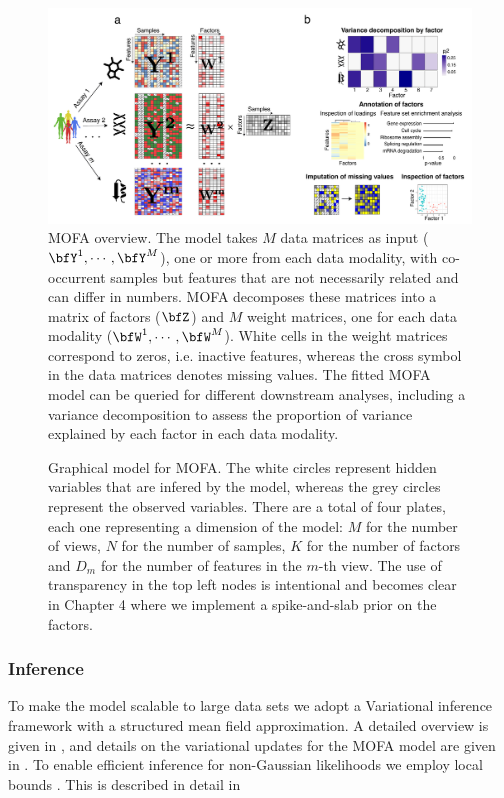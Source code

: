 \begin{figure}[H]
	\begin{center}
		\includegraphics[width=1.0\textwidth]{MOFA}
		\caption{MOFA overview. The model takes $M$ data matrices as input ($\bfY^1, \cdots, \bfY^M$), one or more from each data modality, with co-occurrent samples but features that are not necessarily related and can differ in numbers. MOFA decomposes these matrices into a matrix of factors ($\bfZ$) and $M$ weight matrices, one for each data modality ($\bfW^1, \cdots, \bfW^M$). White cells in the weight matrices correspond to zeros, i.e. inactive features, whereas the cross symbol in the data matrices denotes missing values. The fitted MOFA model can be queried for different downstream analyses, including a variance decomposition to assess the proportion of variance explained by each factor in each data modality.}
		\label{fig:MOFA}
	\end{center}
\end{figure}

\begin{figure}[H]
	\centering
	
	\caption{Graphical model for MOFA. The white circles represent hidden variables that are infered by the model, whereas the grey circles represent the observed variables. There are a total of four plates, each one representing a dimension of the model: $M$ for the number of views, $N$ for the number of samples, $K$ for the number of factors and $D_m$ for the number of features in the $m$-th view. The use of transparency in the top left nodes is intentional and becomes clear in Chapter 4 where we implement a spike-and-slab prior on the factors.}
	\label{fig:MOFA_graphical_model}
\end{figure}

\subsubsection{Inference}
To make the model scalable to large data sets we adopt a Variational inference framework with a structured mean field approximation. A detailed overview is given in , and details on the variational updates for the MOFA model are given in . To enable efficient inference for non-Gaussian likelihoods we employ local bounds \cite{Jaakkola2000,Seeger2012}. This is described in detail in 


